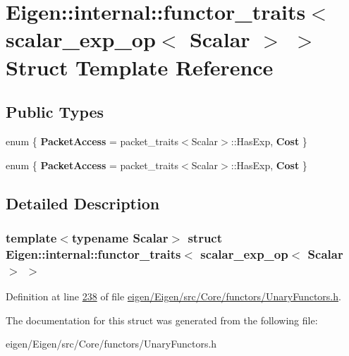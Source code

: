 \hypertarget{struct_eigen_1_1internal_1_1functor__traits_3_01scalar__exp__op_3_01_scalar_01_4_01_4}{}\section{Eigen\+:\+:internal\+:\+:functor\+\_\+traits$<$ scalar\+\_\+exp\+\_\+op$<$ Scalar $>$ $>$ Struct Template Reference}
\label{struct_eigen_1_1internal_1_1functor__traits_3_01scalar__exp__op_3_01_scalar_01_4_01_4}
\subsection*{Public Types}
\begin{DoxyCompactItemize}
\item 
\mbox{\label{struct_eigen_1_1internal_1_1functor__traits_3_01scalar__exp__op_3_01_scalar_01_4_01_4_af140a824aeeba72c6ea8d8188e1762ed}} 
enum \{ {\bfseries Packet\+Access} = packet\+\_\+traits$<$Scalar$>$\+:\+:Has\+Exp, 
{\bfseries Cost}
 \}
\item 
\mbox{\label{struct_eigen_1_1internal_1_1functor__traits_3_01scalar__exp__op_3_01_scalar_01_4_01_4_a6ae256e992f22ad6e577c1994319f10d}} 
enum \{ {\bfseries Packet\+Access} = packet\+\_\+traits$<$Scalar$>$\+:\+:Has\+Exp, 
{\bfseries Cost}
 \}
\end{DoxyCompactItemize}


\subsection{Detailed Description}
\subsubsection*{template$<$typename Scalar$>$\newline
struct Eigen\+::internal\+::functor\+\_\+traits$<$ scalar\+\_\+exp\+\_\+op$<$ Scalar $>$ $>$}



Definition at line \hyperlink{eigen_2_eigen_2src_2_core_2functors_2_unary_functors_8h_source_l00238}{238} of file \hyperlink{eigen_2_eigen_2src_2_core_2functors_2_unary_functors_8h_source}{eigen/\+Eigen/src/\+Core/functors/\+Unary\+Functors.\+h}.



The documentation for this struct was generated from the following file\+:\begin{DoxyCompactItemize}
\item 
eigen/\+Eigen/src/\+Core/functors/\+Unary\+Functors.\+h\end{DoxyCompactItemize}
